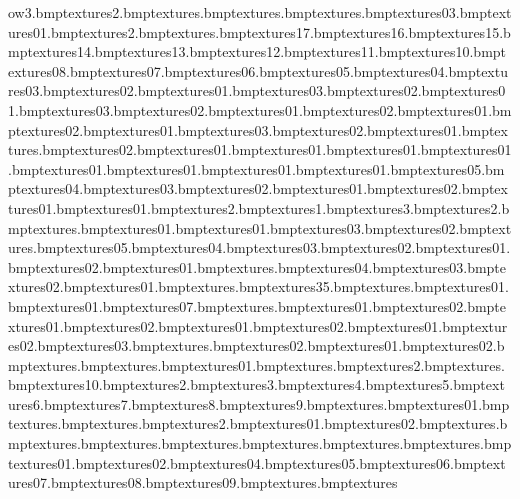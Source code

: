 ow3.bmp textures\supermarketwindow2.bmp textures\supermarketwindow.bmp textures\storeentryhandle.bmp textures\stopper.bmp textures\sportsstar03.bmp textures\sportsstar01.bmp textures\sportsshopwindow2.bmp textures\sportsshopwindow.bmp textures\sportsnfl17.bmp textures\sportsnfl16.bmp textures\sportsnfl15.bmp textures\sportsnfl14.bmp textures\sportsnfl13.bmp textures\sportsnfl12.bmp textures\sportsnfl11.bmp textures\sportsnfl10.bmp textures\sportsnfl08.bmp textures\sportsnfl07.bmp textures\sportsnfl06.bmp textures\sportsnfl05.bmp textures\sportsnfl04.bmp textures\sportsnfl03.bmp textures\sportsnfl02.bmp textures\sportsnfl01.bmp textures\sportsnbo03.bmp textures\sportsnbo02.bmp textures\sportsnbo01.bmp textures\sportsnba03.bmp textures\sportsnba02.bmp textures\sportsnba01.bmp textures\sportsglove02.bmp textures\sportsglove01.bmp textures\sportsball02.bmp textures\sportsball01.bmp textures\spinnysign03.bmp textures\spinnysign02.bmp textures\spinnysign01.bmp textures\speaker.bmp textures\soldiertrouser02.bmp textures\soldiertrouser01.bmp textures\soldierside01.bmp textures\soldiershoudler01.bmp textures\soldierhat01.bmp textures\soldierhand01.bmp textures\soldierfront01.bmp textures\soldierface01.bmp textures\soldiercollar01.bmp textures\soldierboot05.bmp textures\soldierboot04.bmp textures\soldierboot03.bmp textures\soldierboot02.bmp textures\soldierboot01.bmp textures\soldierbag02.bmp textures\soldierbag01.bmp textures\soldierback01.bmp textures\soldierarm2.bmp textures\soldierarm1.bmp textures\slurp3.bmp textures\slurp2.bmp textures\slurp.bmp textures\signtoy01.bmp textures\signtaxi01.bmp textures\signsports03.bmp textures\signsports02.bmp textures\signsports.bmp textures\signsmart05.bmp textures\signsmart04.bmp textures\signsmart03.bmp textures\signsmart02.bmp textures\signsmart01.bmp textures\signpost02.bmp textures\signpost01.bmp textures\signcereal.bmp textures\signboard04.bmp textures\signboard03.bmp textures\signboard02.bmp textures\signboard01.bmp textures\signbeans.bmp textures\sign35.bmp textures\shuttertrial.bmp textures\shoptvstep01.bmp textures\shoptv01.bmp textures\shopsgensign07.bmp textures\alarmclockside.bmp textures\arch01.bmp textures\arch02.bmp textures\barrier01.bmp textures\barrier02.bmp textures\barrierlight01.bmp textures\barrierlight02.bmp textures\barsblue01.bmp textures\barsblue02.bmp textures\barsblue03.bmp textures\battery.bmp textures\battery02.bmp textures\batteryside01.bmp textures\batteryside02.bmp textures\bell.bmp textures\belltops.bmp textures\bigcraneside01.bmp textures\bigpizza.bmp textures\bigpizza2.bmp textures\bigscreen.bmp textures\bigsign10.bmp textures\bigsign2.bmp textures\bigsign3.bmp textures\bigsign4.bmp textures\bigsign5.bmp textures\bigsign6.bmp textures\bigsign7.bmp textures\bigsign8.bmp textures\bigsign9.bmp textures\blacktile.bmp textures\bomb01.bmp textures\bombwindow.bmp textures\bowlingball.bmp textures\bowlingball2.bmp textures\bowlingpin01.bmp textures\bowlingpin02.bmp textures\boxofdynamite.bmp textures\bucket.bmp textures\bucketmop.bmp textures\burgbun.bmp textures\burgmeat.bmp textures\burgtom.bmp textures\cake.bmp textures\camera01.bmp textures\camera02.bmp textures\camera04.bmp textures\camera05.bmp textures\camera06.bmp textures\camera07.bmp textures\camera08.bmp textures\camera09.bmp textures\can.bmp textures\canh